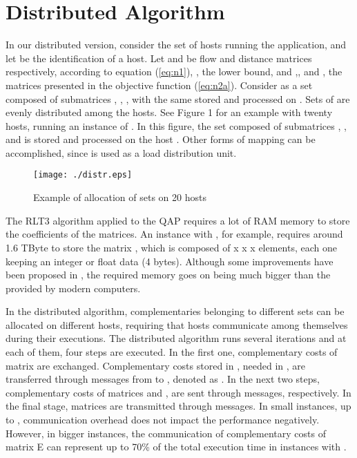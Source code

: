 \documentclass[authoryear,12pt,a4paper,times]{elsarticle}
\begin{document}
\section{Distributed Algorithm} \label{sec:modelo}




In our distributed version, consider  the set of hosts running the application, and let  be the identification of a host.
 Let  and   be  flow and distance matrices respectively, according to equation (\ref{eq:n1}), 
, the lower bound, and ,, and , the matrices presented in the objective function (\ref{eq:n2a}).
Consider  as a set composed of submatrices , , ,   with the same  stored and processed on  . 
Sets of   are evenly distributed among the hosts. See Figure 1 for an example with twenty hosts, running an instance of . 
In this figure,  the set  composed of submatrices ,  ,   and 
 is stored and processed on the host . Other forms of mapping can be accomplished,
since  is used  as a load distribution  unit.



\begin{figure}[!hb]
 \centering
 \texttt{[image: ./distr.eps]}
\label{figura1}
 \caption {Example of allocation of  sets   on  20 hosts}
\end{figure}



The RLT3 algorithm applied to the QAP requires a lot of RAM memory  to store the coefficients of the matrices. 
An instance with  , for example, requires  around 1.6 TByte to store the matrix , which is  composed of  x  x  x 
 elements, each one  keeping  an integer or float  data (4 bytes). 
Although some improvements  have been proposed  in \citet{hahn2012}, the required memory  goes on being  much bigger than the provided  by  modern computers.



In the distributed algorithm, complementaries belonging to different sets can be allocated on different hosts, requiring that hosts communicate 
among themselves during their executions.  
 The distributed algorithm runs several iterations and at each of them, four steps are executed. 
In the first one, complementary costs of matrix  are exchanged. Complementary costs stored in , needed in , are transferred through messages from  to , denoted as . 
In the next two steps, complementary costs of matrices  and ,  are sent through   messages, respectively.
In the  final stage, matrices  are transmitted through  messages. 
In small instances,  up to , communication overhead does not impact the performance negatively. However, in bigger instances,  the communication of complementary costs of matrix E can represent 
 up to  70\% of the total execution time in instances with .\
\end{document}
